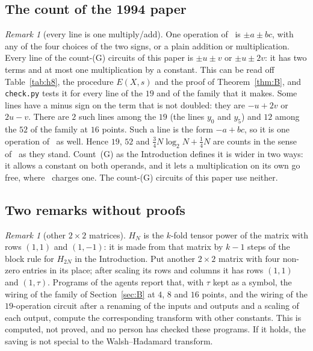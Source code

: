 \documentclass[10pt]{article}
\theoremstyle{remark}
\newtheorem{remark}[proposition]{Remark}
\newcommand{\cntG}{\textup{(G)}}
\renewcommand{\lg}{\log_2}
\begin{document}
\subsection*{The count of the 1994 paper}

\begin{remark}[every line is one multiply/add]\label{rem:cfl}
One operation of~\cite{CFL} is $\pm a\pm bc$, with any of the four choices of the two signs, or a plain
addition or multiplication. Every line of the count-\cntG{} circuits of this paper is $\pm u\pm v$ or
$\pm u\pm 2v$: it has two terms and at most one multiplication by a constant. This can be read off
Table~\ref{tab:h8}, the procedure $E(X,s)$ and the proof of Theorem~\ref{thm:B}, and \verb|check.py| tests
it for every line of the $19$ and of the family that it makes. Some lines have a minus sign on the term that
is not doubled: they are $-u+2v$ or $2u-v$. There are $2$ such lines among the $19$ (the lines $y_0$ and
$y_5$) and $12$ among the $52$ of the family at $16$ points. Such a line is the form $-a+bc$, so it is one
operation of~\cite{CFL} as well. Hence $19$, $52$ and $\tfrac34N\lg N+\tfrac14N$ are counts in the sense
of~\cite{CFL} as they stand. Count~\cntG{} as the Introduction defines it is wider in two ways: it allows a
constant on both operands, and it lets a multiplication on its own go free, where~\cite{CFL} charges one.
The count-\cntG{} circuits of this paper use neither.
\end{remark}

\subsection*{Two remarks without proofs}

\begin{remark}[other $2\times2$ matrices]
$H_N$ is the $k$-fold tensor power of the matrix with rows $(1,1)$ and $(1,-1)$: it is made from that
matrix by $k-1$ steps of the block rule for $H_{2N}$ in the Introduction. Put another $2\times2$ matrix
with four non-zero entries in its place; after scaling its rows and columns it has rows $(1,1)$ and
$(1,\tau)$. Programs of the agents report that, with $\tau$ kept as a symbol, the wiring of the family of
Section~\ref{sec:B} at $4$, $8$ and $16$ points, and the wiring of the $19$-operation circuit after a renaming
of the inputs and outputs and a scaling of each output, compute the corresponding transform with other
constants. This is computed, not proved, and no person has checked these programs. If it holds, the saving
is not special to the Walsh--Hadamard transform.
\end{remark}
\end{document}
